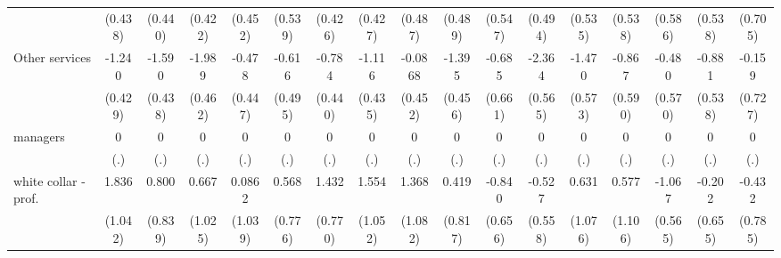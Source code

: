 {\begin{tabular}{l*{16}{c}}
                    &     (0.438)         &     (0.440)         &     (0.422)         &     (0.452)         &     (0.539)         &     (0.426)         &     (0.427)         &     (0.487)         &     (0.489)         &     (0.547)         &     (0.494)         &     (0.535)         &     (0.538)         &     (0.586)         &     (0.538)         &     (0.705)         \\
[1em]
Other services      &      -1.240\sym{**} &      -1.590\sym{***}&      -1.989\sym{***}&      -0.478         &      -0.616         &      -0.784         &      -1.116\sym{*}  &     -0.0868         &      -1.395\sym{**} &      -0.685         &      -2.364\sym{***}&      -1.470\sym{*}  &      -0.867         &      -0.480         &      -0.881         &      -0.159         \\
                    &     (0.429)         &     (0.438)         &     (0.462)         &     (0.447)         &     (0.495)         &     (0.440)         &     (0.435)         &     (0.452)         &     (0.456)         &     (0.661)         &     (0.565)         &     (0.573)         &     (0.590)         &     (0.570)         &     (0.538)         &     (0.727)         \\
[1em]
managers            &           0         &           0         &           0         &           0         &           0         &           0         &           0         &           0         &           0         &           0         &           0         &           0         &           0         &           0         &           0         &           0         \\
                    &         (.)         &         (.)         &         (.)         &         (.)         &         (.)         &         (.)         &         (.)         &         (.)         &         (.)         &         (.)         &         (.)         &         (.)         &         (.)         &         (.)         &         (.)         &         (.)         \\
[1em]
white collar - prof.&       1.836         &       0.800         &       0.667         &      0.0862         &       0.568         &       1.432         &       1.554         &       1.368         &       0.419         &      -0.840         &      -0.527         &       0.631         &       0.577         &      -1.067         &      -0.202         &      -0.432         \\
                    &     (1.042)         &     (0.839)         &     (1.025)         &     (1.039)         &     (0.776)         &     (0.770)         &     (1.052)         &     (1.082)         &     (0.817)         &     (0.656)         &     (0.558)         &     (1.076)         &     (1.106)         &     (0.565)         &     (0.655)         &     (0.785)         \\

\end{tabular}}
